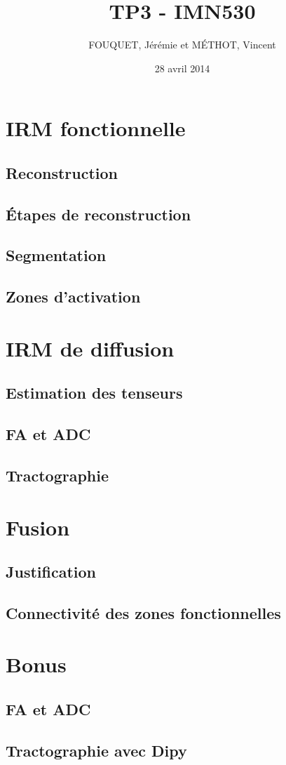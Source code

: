 \documentclass[a4paper]{article}
\title{TP3 - IMN530}
\author{FOUQUET, Jérémie et MÉTHOT, Vincent}
\date{28 avril 2014}
\begin{document}
\maketitle

\section{IRM fonctionnelle}

\subsection{Reconstruction}



\subsection{Étapes de reconstruction}

\subsection{Segmentation}

\subsection{Zones d'activation}

\section{IRM de diffusion}

\subsection{Estimation des tenseurs}

\subsection{FA et ADC}

\subsection{Tractographie}

\section{Fusion}

\subsection{Justification}

\subsection{Connectivité des zones fonctionnelles}

\section{Bonus}

\subsection{FA et ADC}

\subsection{Tractographie avec Dipy}
\end{document}
